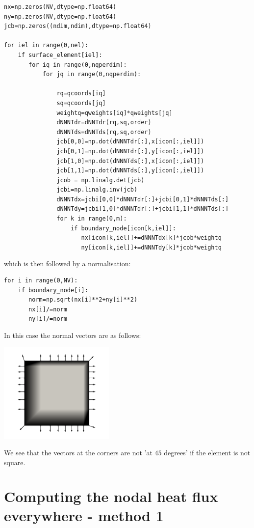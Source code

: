 \begin{lstlisting}
nx=np.zeros(NV,dtype=np.float64) 
ny=np.zeros(NV,dtype=np.float64) 
jcb=np.zeros((ndim,ndim),dtype=np.float64)

for iel in range(0,nel):
    if surface_element[iel]: 
       for iq in range(0,nqperdim):
           for jq in range(0,nqperdim):

               rq=qcoords[iq]
               sq=qcoords[jq]
               weightq=qweights[iq]*qweights[jq]
               dNNNTdr=dNNTdr(rq,sq,order)
               dNNNTds=dNNTds(rq,sq,order)
               jcb[0,0]=np.dot(dNNNTdr[:],x[icon[:,iel]])
               jcb[0,1]=np.dot(dNNNTdr[:],y[icon[:,iel]])
               jcb[1,0]=np.dot(dNNNTds[:],x[icon[:,iel]])
               jcb[1,1]=np.dot(dNNNTds[:],y[icon[:,iel]])
               jcob = np.linalg.det(jcb)
               jcbi=np.linalg.inv(jcb)
               dNNNTdx=jcbi[0,0]*dNNNTdr[:]+jcbi[0,1]*dNNNTds[:]
               dNNNTdy=jcbi[1,0]*dNNNTdr[:]+jcbi[1,1]*dNNNTds[:]
               for k in range(0,m):
                   if boundary_node[icon[k,iel]]:
                      nx[icon[k,iel]]+=dNNNTdx[k]*jcob*weightq
                      ny[icon[k,iel]]+=dNNNTdy[k]*jcob*weightq
\end{lstlisting}
which is then followed by a normalisation:
\begin{lstlisting}
for i in range(0,NV):
    if boundary_node[i]:
       norm=np.sqrt(nx[i]**2+ny[i]**2)
       nx[i]/=norm
       ny[i]/=norm
\end{lstlisting}

In this case the normal vectors are as follows:
\begin{center}
\includegraphics[width=5.7cm]{python_codes/fieldstone_173/results/exp1/normals}
\end{center}
We see that the vectors at the corners are not 'at $45$ degrees' if the element is not square.


\section*{Computing the nodal heat flux everywhere - method 1}

